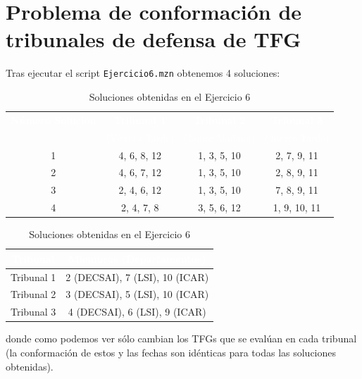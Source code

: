 \documentclass[11pt]{article}
\begin{document}
\section{Problema de conformación de tribunales de defensa de TFG}

Tras ejecutar el script \verb|Ejercicio6.mzn| obtenemos 4 soluciones:

\begin{table}[H]
    \centering
    \vspace{0.3cm}
    \small
    \begin{tabular}{|c|c|c|c|}
        \hline
        \rowcolor{maincolor}
        \textcolor{white}{\textbf{Número Solución}} & 
        \textcolor{white}{\textbf{Tribunal 1}} & 
        \textcolor{white}{\textbf{Tribunal 2}} & 
        \textcolor{white}{\textbf{Tribunal 3}} \\
        \rowcolor{maincolor}
        &
        \textcolor{white}{{(Viernes Tarde)}} & 
        \textcolor{white}{{(Lunes Mañana)}} & 
        \textcolor{white}{{(Jueves Tarde)}} \\
        \hline
        1 & 4, 6, 8, 12 & 1, 3, 5, 10 & 2, 7, 9, 11 \\
        2 & 4, 6, 7, 12 & 1, 3, 5, 10 & 2, 8, 9, 11 \\
        3 & 2, 4, 6, 12 & 1, 3, 5, 10 & 7, 8, 9, 11 \\
        4 & 2, 4, 7, 8  & 3, 5, 6, 12 & 1, 9, 10, 11 \\
        \hline
    \end{tabular}
    
    \vspace{0.4cm}
    \footnotesize
    \begin{tabular}{|c|c|}
        \hline
        \rowcolor{maincolor}
        \textcolor{white}{\textbf{Tribunal}} & 
        \textcolor{white}{\textbf{Miembros (Departamentos)}} \\ 
        \hline
        Tribunal 1 & 2 (DECSAI), 7 (LSI), 10 (ICAR) \\ 
        Tribunal 2 & 3 (DECSAI), 5 (LSI), 10 (ICAR) \\ 
        Tribunal 3 & 4 (DECSAI), 6 (LSI), 9 (ICAR) \\ 
        \hline
    \end{tabular}
    \caption{Soluciones obtenidas en el Ejercicio 6}
\end{table}

donde como podemos ver sólo cambian los TFGs que se evalúan en cada tribunal (la conformación de estos y las fechas son idénticas para todas las soluciones obtenidas).
\end{document}
